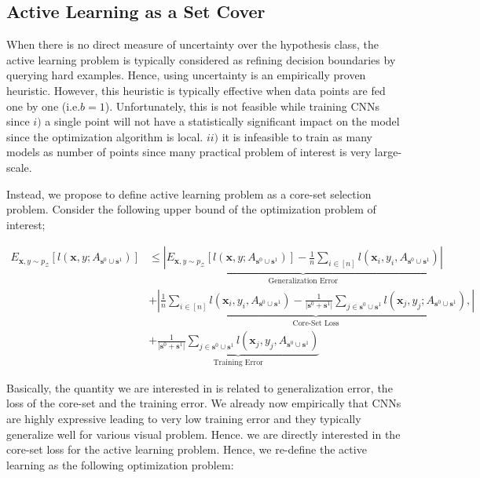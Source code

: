 \documentclass{article} %
\makeatletter
\newcommand*{\ie}{i.e.\@\xspace}
\makeatother
\begin{document}
\subsection{Active Learning as a Set Cover} When there is no direct measure of uncertainty over the hypothesis class, the
active learning problem is typically considered as refining decision boundaries by querying hard examples. Hence, using
uncertainty is an empirically proven heuristic. However, this heuristic is typically effective when data points are fed
one by one (\ie $b=1$). Unfortunately, this is not feasible while training CNNs since $i)$ a single point will not have
a statistically significant impact on the model since the optimization algorithm is local. $ii)$ it is infeasible to
train as many models as number of points since many practical problem of interest is very large-scale.

Instead, we propose to define active learning problem as a core-set selection problem. Consider the following upper
bound of the optimization problem of interest;

\begin{equation} \begin{aligned} E_{\mathbf{x},y \sim p_\mathcal{Z}} [l(\mathbf{x},y; A_{\mathbf{s}^0 \cup
    \mathbf{s}^1})]  &\leq \underbrace{\left| E_{\mathbf{x},y \sim p_\mathcal{Z}} [l(\mathbf{x},y; A_{\mathbf{s}^0 \cup
    \mathbf{s}^1})] - \frac{1}{n}\sum_{i \in [n]} l(\mathbf{x}_i,y_i,A_{\mathbf{s}^0 \cup \mathbf{s}^1}) \right|}_{\text{Generalization Error}} \\ &+
    \underbrace{\left| \frac{1}{n}\sum_{i \in [n]} l(\mathbf{x}_i,y_i,A_{\mathbf{s}^0 \cup \mathbf{s}^1}) -
    \frac{1}{|\mathbf{s}^0+\mathbf{s}^1|}\sum_{j \in \mathbf{s}^0 \cup \mathbf{s}^1} l(\mathbf{x}_j,y_j;A_{\mathbf{s}^0 \cup \mathbf{s}^1}),
    \right|}_{\text{Core-Set Loss}} \\ &+ \underbrace{\frac{1}{|\mathbf{s}^0+\mathbf{s}^1|}\sum_{j \in
\mathbf{s}^0 \cup \mathbf{s}^1} l(\mathbf{x}_j,y_j,A_{\mathbf{s}^0 \cup \mathbf{s}^1})}_{\text{Training Error}} \end{aligned} \end{equation} 

Basically, the quantity we are interested in is related to generalization error, the loss of the core-set and the
training error. We already now empirically that CNNs are highly expressive leading to very low training error and they
typically generalize well for various visual problem. Hence. we are directly interested in the core-set loss for the
active learning problem. Hence, we re-define the active learning as the following optimization problem:
\end{document}
